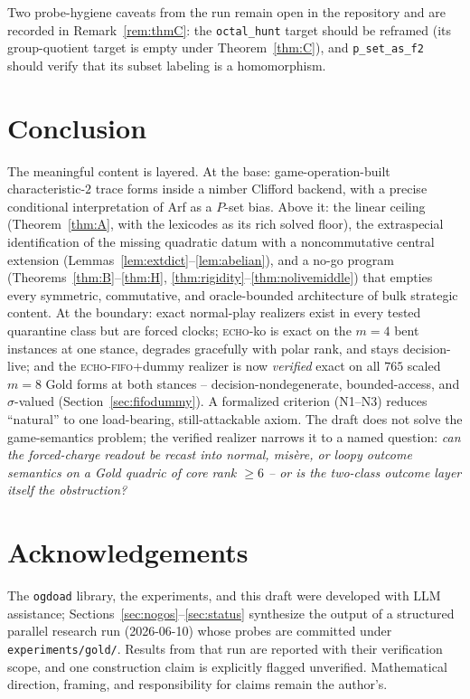 \documentclass[11pt]{article}
\theoremstyle{plain}
\theoremstyle{definition}
\begin{document}
Two probe-hygiene caveats from the run remain open in the repository and
are recorded in Remark~\ref{rem:thmC}: the \texttt{octal\_hunt} target
should be reframed (its group-quotient target is empty under
Theorem~\ref{thm:C}), and \texttt{p\_set\_as\_f2} should verify that its
subset labeling is a homomorphism.

\section{Conclusion}

The meaningful content is layered. At the base: game-operation-built
characteristic-$2$ trace forms inside a nimber Clifford backend, with a
precise conditional interpretation of Arf as a $P$-set bias. Above it: the
linear ceiling (Theorem~\ref{thm:A}, with the lexicodes as its rich solved
floor), the extraspecial identification of the missing quadratic datum with
a noncommutative central extension (Lemmas~\ref{lem:extdict}--\ref{lem:abelian}),
and a no-go program (Theorems~\ref{thm:B}--\ref{thm:H},
\ref{thm:rigidity}--\ref{thm:nolivemiddle}) that empties every symmetric,
commutative, and oracle-bounded architecture of bulk strategic content. At
the boundary: exact normal-play realizers exist in every tested quarantine
class but are forced clocks; \textsc{echo}-ko is exact on the $m=4$ bent
instances at one stance, degrades gracefully with polar rank, and stays
decision-live; and the \textsc{echo}-\textsc{fifo}+dummy realizer is now
\emph{verified} exact on all $765$ scaled $m=8$ Gold forms at both stances
-- decision-nondegenerate, bounded-access, and $\sigma$-valued
(Section~\ref{sec:fifodummy}). A formalized criterion (N1--N3) reduces
``natural'' to one load-bearing, still-attackable axiom. The draft does
not solve the game-semantics problem; the verified realizer narrows it to
a named question: \emph{can the forced-charge readout be recast into
normal, misère, or loopy outcome semantics on a Gold quadric of core
rank $\geq6$ -- or is the two-class outcome layer itself the obstruction?}

\section*{Acknowledgements}
The \texttt{ogdoad} library, the experiments, and this draft were developed
with LLM assistance; Sections~\ref{sec:nogos}--\ref{sec:status} synthesize
the output of a structured parallel research run (2026-06-10) whose probes
are committed under \texttt{experiments/gold/}. Results from that run are
reported with their verification scope, and one construction claim is
explicitly flagged unverified. Mathematical direction, framing, and
responsibility for claims remain the author's.
\end{document}
